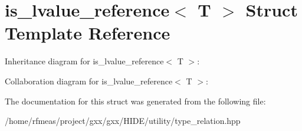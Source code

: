 \hypertarget{structis__lvalue__reference}{}\section{is\+\_\+lvalue\+\_\+reference$<$ T $>$ Struct Template Reference}
\label{structis__lvalue__reference}


Inheritance diagram for is\+\_\+lvalue\+\_\+reference$<$ T $>$\+:


Collaboration diagram for is\+\_\+lvalue\+\_\+reference$<$ T $>$\+:


The documentation for this struct was generated from the following file\+:\begin{DoxyCompactItemize}
\item 
/home/rfmeas/project/gxx/gxx/\+H\+I\+D\+E/utility/type\+\_\+relation.\+hpp\end{DoxyCompactItemize}

